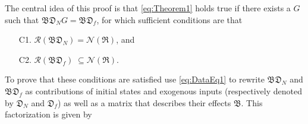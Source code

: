 The central idea of this proof is that \eqref{eq:Theorem1} holds true if there exists a $G$ such that $\mathfrak{BD}_N G=\mathfrak{BD}_f$, for which sufficient conditions are that
\begin{enumerate}
    \item[C1.] $\mathcal{R}(\mathfrak{BD}_N)=\mathcal{N}(\mathfrak{R})$, and
    \item[C2.] $\mathcal{R}(\mathfrak{BD}_f)\;\subseteq\mathcal{N}(\mathfrak{R})$.
\end{enumerate}
To prove that these conditions are satisfied use \eqref{eq:DataEq1} to rewrite $\mathfrak{BD}_N$ and $\mathfrak{BD}_f$ as contributions of initial states and exogenous inputs (respectively denoted by $\mathfrak{D}_N$ and $\mathfrak{D}_f$) as well as a matrix that describes their effects $\mathfrak{B}$. This factorization is given by
